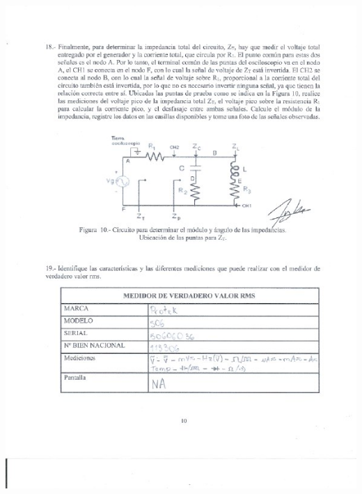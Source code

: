 \documentclass[12pt]{article}
\begin{document}
	\includegraphics[width=16cm,height=21cm]{Img/Resultados_7}\\
\end{document}
